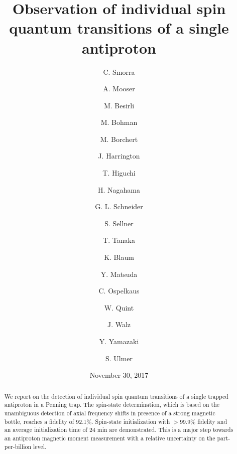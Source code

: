 \documentclass[12pt,preprint%
]{elsarticle}
\begin{document}
\title{Observation of individual spin quantum transitions of a single antiproton}%

\begin{abstract}
We report on the detection of individual spin quantum transitions of a single trapped antiproton in a Penning trap. The spin-state determination, which is based on the unambiguous detection of axial frequency shifts in presence of a strong magnetic bottle, reaches a fidelity of 92.1$\%$. Spin-state initialization with $>99.9\%$ fidelity and an average initialization time of 24 min are demonstrated. This is a major step towards an antiproton magnetic moment measurement with a relative uncertainty on the part-per-billion level.
\end{abstract}

\author[riken,cern]{C. Smorra}
\author[riken]{A. Mooser}
\author[riken]{M. Besirli}
\author[riken,mpik]{M. Bohman}
\author[riken,iqo]{M. Borchert}
\author[mpik]{J. Harrington} 
\author[riken,ut]{T. Higuchi}
\author[riken,ut]{H. Nagahama}
\author[iphm]{G. L. Schneider}
\author[riken]{S. Sellner}
\author[riken,ut]{T. Tanaka}
\author[mpik]{K. Blaum}
\author[ut]{Y. Matsuda}
\author[iqo,ptb]{C. Ospelkaus}
\author[gsi]{W. Quint}
\author[iphm,him]{J. Walz}
\author[aplriken]{Y. Yamazaki}
\author[riken]{S. Ulmer}

\address[riken]{Ulmer Initiative Research Unit, RIKEN, 2-1 Hirosawa, Wako, Saitama 351-0198, Japan}
\address[cern]{CERN, CH-1211 Geneva 23, Switzerland}
\address[mpik]{Max-Planck-Institut f\"ur Kernphysik, Saupfercheckweg 1, D-69117 Heidelberg, Germany}
\address[iqo]{Institute of Quantum Optics, Leibniz Universit\"at Hannover, Welfengarten 1, D-30167 Hannover, Germany}
\address[ut]{Graduate School of Arts and Sciences, University of Tokyo, 3-8-1 Komaba, Meguro-ku, Tokyo 153-8902, Japan}
\address[iphm]{Institut f\"ur Physik, Johannes Gutenberg-Universit\"at Mainz, D-55099 Mainz, Germany}
\address[ptb]{Physikalisch-Technische Bundesanstalt, Bundesallee 100, D-38116 Braunschweig, Germany}
\address[gsi]{GSI-Helmholtzzentrum f\"ur Schwerionenforschung, D-64291 Darmstadt, Germany}
\address[uhd]{Ruprecht-Karls-Universit\"at Heidelberg, D-69047 Heidelberg, Germany}
\address[him]{Helmholtz-Institut Mainz, D-55099 Mainz, Germany}
\address[aplriken]{Atomic Physics Laboratory, RIKEN, 2-1 Hirosawa, Wako, Saitama 351-0198, Japan}
\date{November 30, 2017}%
\maketitle
\end{document}
